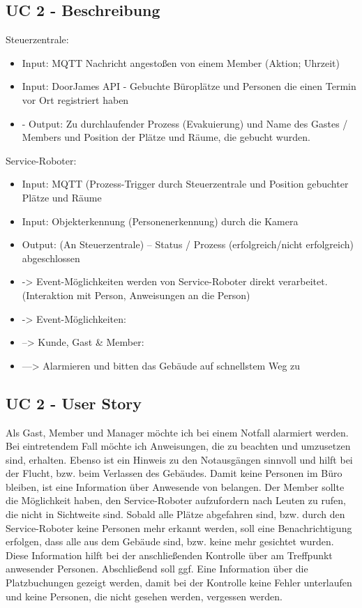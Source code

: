\subsection*{UC 2 - Beschreibung}
    Steuerzentrale:
    \begin{itemize}
        \item Input: MQTT Nachricht angestoßen von einem Member (Aktion; Uhrzeit)
        \item Input: DoorJames API - Gebuchte Büroplätze und Personen die einen Termin vor Ort registriert haben
        \item -	Output: Zu durchlaufender Prozess (Evakuierung) und Name des Gastes / Members und Position der Plätze und Räume, die gebucht wurden. 
    \end{itemize}
	
    Service-Roboter: 
    \begin{itemize}
        \item Input: MQTT (Prozess-Trigger durch Steuerzentrale und Position gebuchter Plätze und Räume
        \item Input: Objekterkennung (Personenerkennung) durch die Kamera
        \item Output: (An Steuerzentrale) – Status / Prozess (erfolgreich/nicht erfolgreich) abgeschlossen
        \item -> Event-Möglichkeiten werden von Service-Roboter direkt verarbeitet. (Interaktion mit Person, Anweisungen an die Person) 
        \item -> Event-Möglichkeiten: 
        \item --> Kunde, Gast & Member: 
        \item ---> Alarmieren und bitten das Gebäude auf schnellstem Weg zu
    \end{itemize}

\subsection*{UC 2 - User Story}
    Als Gast, Member und Manager möchte ich bei einem Notfall alarmiert werden. Bei eintretendem Fall möchte ich 
    Anweisungen, die zu beachten und umzusetzen sind, erhalten. Ebenso ist ein Hinweis zu den Notausgängen sinnvoll 
    und hilft bei der Flucht, bzw. beim Verlassen des Gebäudes. Damit keine Personen im Büro bleiben, ist eine 
    Information über Anwesende von belangen. Der Member sollte die Möglichkeit haben, den Service-Roboter 
    aufzufordern nach Leuten zu rufen, die nicht in Sichtweite sind. Sobald alle Plätze abgefahren sind, bzw. 
    durch den Service-Roboter keine Personen mehr erkannt werden, soll eine Benachrichtigung erfolgen, dass alle 
    aus dem Gebäude sind, bzw. keine mehr gesichtet wurden. Diese Information hilft bei der anschließenden Kontrolle 
    über am Treffpunkt anwesender Personen. Abschließend soll ggf. Eine Information über die Platzbuchungen gezeigt 
    werden, damit bei der Kontrolle keine Fehler unterlaufen und keine Personen, die nicht gesehen werden, vergessen 
    werden. 